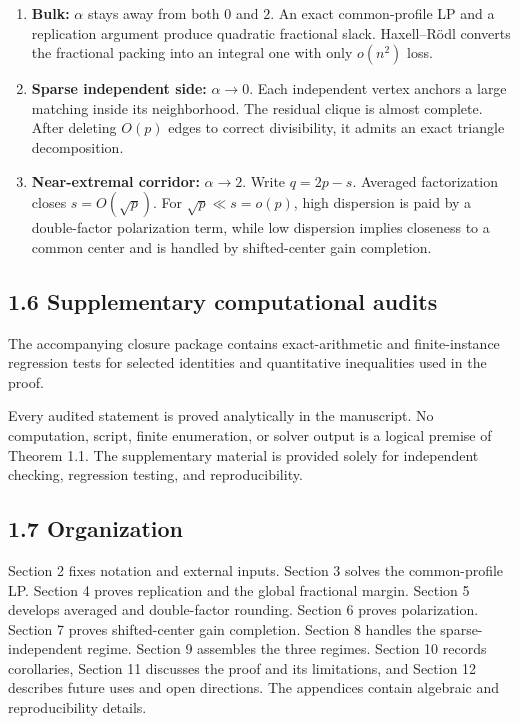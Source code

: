 \documentclass[11pt,a4paper]{article}
\begin{document}
\begin{enumerate}
\def\labelenumi{\arabic{enumi}.}
\item
  \textbf{Bulk:} \(\alpha\) stays away from both \(0\) and \(2\). An exact common-profile LP and a replication argument produce quadratic fractional slack. Haxell--Rödl converts the fractional packing into an integral one with only \(o(n^2)\) loss.
\item
  \textbf{Sparse independent side:} \(\alpha\to0\). Each independent vertex anchors a large matching inside its neighborhood. The residual clique is almost complete. After deleting \(O(p)\) edges to correct divisibility, it admits an exact triangle decomposition.
\item
  \textbf{Near-extremal corridor:} \(\alpha\to2\). Write \(q=2p-s\). Averaged factorization closes \(s=O(\sqrt p)\). For \(\sqrt p\ll s=o(p)\), high dispersion is paid by a double-factor polarization term, while low dispersion implies closeness to a common center and is handled by shifted-center gain completion.
\end{enumerate}

\subsection{1.6 Supplementary computational audits}\label{supplementary-computational-audits}

The accompanying closure package contains exact-arithmetic and finite-instance regression tests for selected identities and quantitative inequalities used in the proof.

Every audited statement is proved analytically in the manuscript. No computation, script, finite enumeration, or solver output is a logical premise of Theorem 1.1. The supplementary material is provided solely for independent checking, regression testing, and reproducibility.

\subsection{1.7 Organization}\label{organization}

Section 2 fixes notation and external inputs. Section 3 solves the common-profile LP. Section 4 proves replication and the global fractional margin. Section 5 develops averaged and double-factor rounding. Section 6 proves polarization. Section 7 proves shifted-center gain completion. Section 8 handles the sparse-independent regime. Section 9 assembles the three regimes. Section 10 records corollaries, Section 11 discusses the proof and its limitations, and Section 12 describes future uses and open directions. The appendices contain algebraic and reproducibility details.
\end{document}
